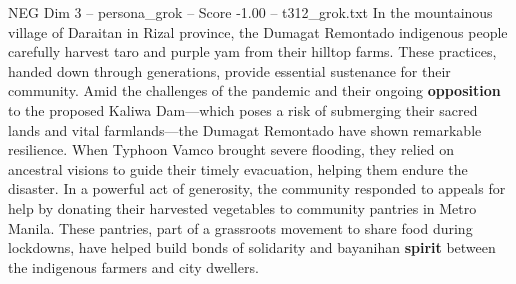 \begin{textsample}{NEG Dim 3 – persona\_grok – Score -1.00 – t312\_grok.txt}  \label{ex:f3_neg_022}
In the mountainous village of Daraitan in Rizal province, the Dumagat Remontado indigenous people carefully harvest taro and purple yam from their hilltop farms.
These practices, handed down through generations, provide essential sustenance for their community.
Amid the challenges of the pandemic and their ongoing \textbf{opposition} to the proposed Kaliwa Dam—which poses a risk of submerging their sacred lands and vital farmlands—the Dumagat Remontado have shown remarkable resilience.
When Typhoon Vamco brought severe flooding, they relied on ancestral visions to guide their timely evacuation, helping them endure the disaster.
In a powerful act of generosity, the community responded to appeals for help by donating their harvested vegetables to community pantries in Metro Manila.
These pantries, part of a grassroots movement to share food during lockdowns, have helped build bonds of solidarity and bayanihan \textbf{spirit} between the indigenous farmers and city dwellers.

\end{textsample}
